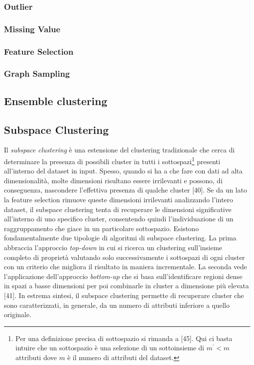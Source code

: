 \subsubsection{Outlier}
\subsubsection{Missing Value}
\subsubsection{Feature Selection}
\subsubsection{Graph Sampling}

\subsection{Ensemble clustering}
\subsection{Subspace Clustering}
Il \textit{subspace clustering} \`e una estensione del clustering tradizionale che cerca di determinare la presenza di possibili cluster in tutti i sottospazi\footnote{Per una definizione precisa di sottospazio si rimanda a [45]. Qui ci basta intuire che un sottospazio \`e una selezione di un sottoinsieme di $ m^{'} < m $ attributi dove $ m $ \`e il numero di attributi del dataset.} presenti all'interno del dataset in input. 
Spesso, quando si ha a che fare con dati ad alta dimensionalit\`a, molte dimensioni risultano essere irrilevanti e possono, di conseguenza, nascondere l'effettiva presenza di qualche cluster [40]. Se da un lato la feature selection rimuove queste dimensioni irrilevanti analizzando l'intero dataset, il subspace clustering tenta di recuperare le dimensioni significative all'interno di uno specifico cluster, consentendo quindi l'individuazione di un raggruppamento che giace in un particolare sottospazio. Esistono fondamentalmente due tipologie di algoritmi di subspace clustering. La prima abbraccia l'approccio \textit{top-down} in cui si ricerca un clustering sull'insieme completo di propriet\`a valutando solo successivamente i sottospazi di ogni cluster con un criterio che migliora il risultato in maniera incrementale. La seconda vede l'applicazione dell'approccio \textit{bottom-up} che si basa sull'identificare regioni dense in spazi a basse dimensioni per poi combinarle in cluster a dimensione pi\`u elevata [41]. In estrema sintesi, il subspace clustering permette di recuperare cluster che sono caratterizzati, in generale, da un numero di attributi inferiore a quello originale. 

